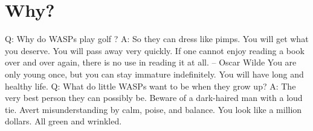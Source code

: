 \section{Why?}
Q:	Why do WASPs play golf ?
A:	So they can dress like pimps.
You will get what you deserve.
You will pass away very quickly.
If one cannot enjoy reading a book over and over again, there is no use
in reading it at all.
		-- Oscar Wilde
You are only young once, but you can stay immature indefinitely.
You will have long and healthy life.
Q:	What do little WASPs want to be when they grow up?
A:	The very best person they can possibly be.
Beware of a dark-haired man with a loud tie.
Avert misunderstanding by calm, poise, and balance.
You look like a million dollars.  All green and wrinkled.

